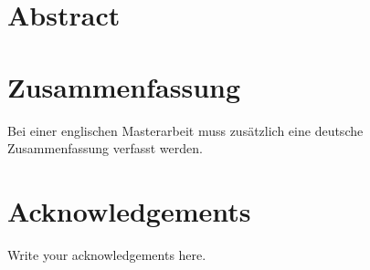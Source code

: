 \documentclass[acmsmall,nonacm,screen]{acmart}
\begin{document}
\setcounter{page}{1}


\section*{Abstract}

\newpage

\section*{Zusammenfassung}

Bei einer englischen Masterarbeit muss zus\"atzlich eine deutsche Zusammenfassung verfasst werden.

\newpage

\section*{Acknowledgements}

Write your acknowledgements here.

\cleardoublepage



\small\normalsize
{} %
\tableofcontents
{}


\small\normalsize

\cleardoublepage


\end{document}
